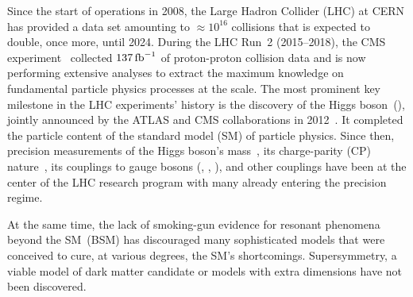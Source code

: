 \documentclass[a4paper,11pt]{article}
\newcommand{\Pb}{{{\Pqb}}\xspace}
\newcommand{\Pt}{{{\Pqt}}\xspace}
\newcommand{\Ps}{{{\Pqs}}\xspace}
\newcommand{\Pc}{{{\Pqc}}\xspace}
\newcommand{\Pd}{{{\Pqd}}\xspace}
\newcommand{\Pu}{{{\Pqu}}\xspace}
\begin{document}
Since the start of operations in 2008, the Large Hadron Collider (LHC) at CERN has provided a data set amounting to $\approx10^{16}$ collisions that is expected to double, once more, until 2024.
During the LHC Run~2 (2015--2018), the CMS experiment~\cite{CMS_ex} collected  $137\mbox{\ensuremath{\,\text{fb}^{-1}}}$ of proton-proton collision data  and is now performing extensive analyses to extract the maximum knowledge on fundamental particle physics processes at the \TeV scale.
The most prominent key milestone in the LHC experiments' history is the discovery of the Higgs boson~(\PH), jointly announced by the ATLAS and CMS collaborations in 2012~\cite{Aad:2012tfa,Chatrchyan:2012ufa}.
It completed the particle content of the standard model (SM) of particle physics. 
Since then, precision measurements of the Higgs boson's mass~\cite{CMS:2017dib,CMS:2020xrn}, its charge-parity (CP) nature~\cite{CMS:2019jdw,CMS:2020cga}, its couplings to gauge bosons (\PW, \PZ, \Pgg), and other couplings have been at the center of the LHC research program with many already entering the precision regime.

At the same time, the lack of smoking-gun evidence for resonant phenomena beyond the SM~(BSM) has discouraged many sophisticated models that were conceived to cure, at various degrees, the SM's shortcomings. Supersymmetry, a viable model of dark matter candidate or models with extra dimensions have not been discovered. 
\end{document}
